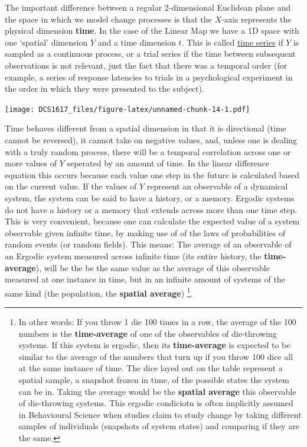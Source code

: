 \documentclass[]{book}
\let\rmarkdownfootnote\footnote%
\def\footnote{\protect\rmarkdownfootnote}
\begin{document}
The important difference between a regular 2-dimensional Euclidean plane
and the space in which we model change processes is that the \(X\)-axis
represents the physical dimension \textbf{time}. In the case of the
Linear Map we have a 1D space with one `spatial' dimension \(Y\) and a
time dimension \(t\). This is called
\href{https://en.wikipedia.org/wiki/Time_series}{time series} if \(Y\)
is sampled as a continuous process, or a trial series if the time
between subsequent observations is not relevant, just the fact that
there was a temporal order (for example, a series of response latencies
to trials in a psychological experiment in the order in which they were
presented to the subject).

\texttt{[image: DCS1617\_files/figure-latex/unnamed-chunk-14-1.pdf]}

Time behaves different from a spatial dimension in that it is
directional (time cannot be reversed), it cannot take on negative
values, and, unless one is dealing with a truly random process, there
will be a temporal correlation across one or more values of \(Y\)
seperated by an amount of time. In the linear difference equation this
occurs because each value one step in the future is calculated based on
the current value. If the values of \(Y\) represent an observable of a
dynamical system, the system can be said to have a history, or a memory.
Ergodic systems do not have a history or a memory that extends across
more than one time step. This is very convenient, because one can
calculate the expected value of a system observable given infinite time,
by making use of of the laws of probabilities of random events (or
random fields). This means: The average of an observable of an Ergodic
system measured across infinite time (its entire history, the
\textbf{time-average}), will be the be the same value as the average of
this observable measured at one instance in time, but in an infinite
amount of systems of the same kind (the population, the \textbf{spatial
average}) \footnote{In other words: If you throw 1 die 100 times in a
  row, the average of the 100 numbers is the \textbf{time-average} of
  one of the observables of die-throwing systems. If this system is
  ergodic, then its \textbf{time-average} is expected to be similar to
  the average of the numbers that turn up if you throw 100 dice all at
  the same instance of time. The dice layed out on the table represent a
  spatial sample, a snapshot frozen in time, of the possible states the
  system can be in. Taking the average would be the \textbf{spatial
  average} this observable of die-throwing systems. This ergodic
  condiciotn is often implicitly assumed in Behavioural Science when
  studies claim to study change by taking different samples of
  individuals (snapshots of system states) and comparing if they are the
  same.}.
\end{document}
